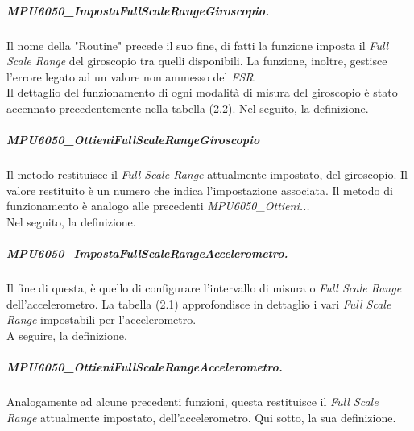 \subparagraph{MPU6050\_ImpostaFullScaleRangeGiroscopio.}
Il nome della "Routine" precede il suo fine, di fatti la funzione imposta il \textit{Full Scale Range} del giroscopio tra quelli disponibili. La funzione, inoltre, gestisce l'errore legato ad un valore non ammesso del \textit{FSR}.\\
Il dettaglio del funzionamento di ogni modalità di misura del giroscopio è stato accennato precedentemente nella tabella (2.2).
Nel seguito, la definizione.


\subparagraph{MPU6050\_OttieniFullScaleRangeGiroscopio}
Il metodo restituisce il \textit{Full Scale Range} attualmente impostato, del giroscopio. Il valore restituito è un numero che indica l'impostazione associata. Il metodo di funzionamento è analogo alle precedenti \textit{MPU6050\_Ottieni...}\\
Nel seguito, la definizione.

\subparagraph{MPU6050\_ImpostaFullScaleRangeAccelerometro.}
Il fine di questa, è quello di configurare l'intervallo di misura o \textit{Full Scale Range} dell'accelerometro. La tabella (2.1) approfondisce in dettaglio i vari \textit{Full Scale Range} impostabili per l'accelerometro.\\
A seguire, la definizione.


\subparagraph{MPU6050\_OttieniFullScaleRangeAccelerometro.}
Analogamente ad alcune precedenti funzioni, questa restituisce il \textit{Full Scale Range} attualmente impostato, dell'accelerometro.
Qui sotto, la sua definizione.



